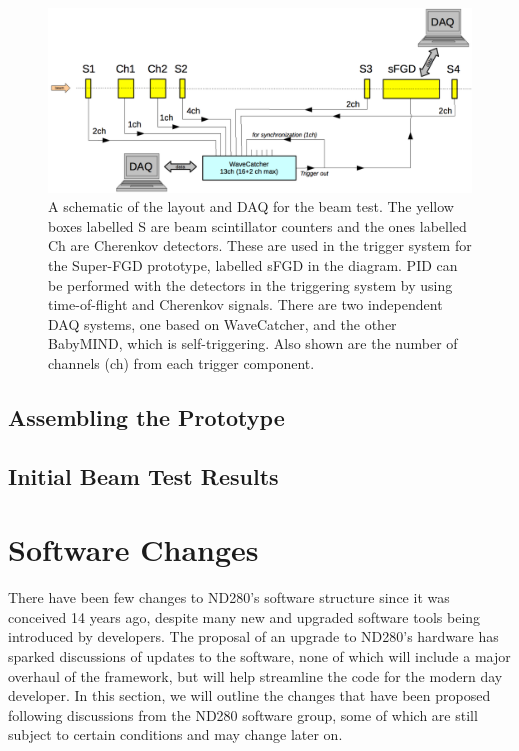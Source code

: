\documentclass[aps,pra,12pt,notitlepage,tightenlines]{revtex4-1}
\begin{document}
\begin{figure}
 \includegraphics[scale=0.55]{daq}
 \caption{A schematic of the layout and DAQ for the beam test. The yellow boxes labelled S are beam scintillator counters and the ones labelled Ch are Cherenkov detectors. These are used in the trigger system for the Super-FGD prototype, labelled sFGD in the diagram. PID can be performed with the detectors in the triggering system by using time-of-flight and Cherenkov signals. There are two independent DAQ systems, one based on WaveCatcher, and the other BabyMIND, which is self-triggering. Also shown are the number of channels (ch) from each trigger component.}
 \label{fig:daq}
\end{figure}

\subsection{Assembling the Prototype}

\subsection{Initial Beam Test Results}

\section{Software Changes}
There have been few changes to ND280's software structure since it was conceived 14 years ago, despite many new and upgraded software tools being introduced by developers. The proposal of an upgrade to ND280's hardware has sparked discussions of updates to the software, none of which will include a major overhaul of the framework, but will help streamline the code for the modern day developer. In this section, we will outline the changes that have been proposed following discussions from the ND280 software group, some of which are still subject to certain conditions and may change later on.
\end{document}

